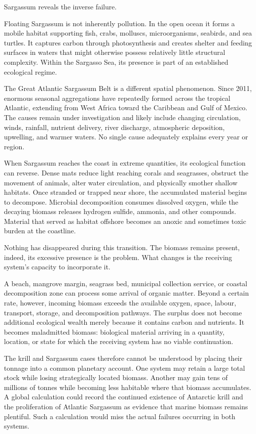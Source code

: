 \documentclass[11pt,oneside]{book}
\begin{document}
Sargassum reveals the inverse failure.

Floating Sargassum is not inherently pollution. In the open ocean it forms a mobile habitat supporting fish, crabs, molluscs, microorganisms, seabirds, and sea turtles. It captures carbon through photosynthesis and creates shelter and feeding surfaces in waters that might otherwise possess relatively little structural complexity. Within the Sargasso Sea, its presence is part of an established ecological regime.

The Great Atlantic Sargassum Belt is a different spatial phenomenon. Since 2011, enormous seasonal aggregations have repeatedly formed across the tropical Atlantic, extending from West Africa toward the Caribbean and Gulf of Mexico. The causes remain under investigation and likely include changing circulation, winds, rainfall, nutrient delivery, river discharge, atmospheric deposition, upwelling, and warmer waters. No single cause adequately explains every year or region.

When Sargassum reaches the coast in extreme quantities, its ecological function can reverse. Dense mats reduce light reaching corals and seagrasses, obstruct the movement of animals, alter water circulation, and physically smother shallow habitats. Once stranded or trapped near shore, the accumulated material begins to decompose. Microbial decomposition consumes dissolved oxygen, while the decaying biomass releases hydrogen sulfide, ammonia, and other compounds. Material that served as habitat offshore becomes an anoxic and sometimes toxic burden at the coastline.

Nothing has disappeared during this transition. The biomass remains present, indeed, its excessive presence is the problem. What changes is the receiving system's capacity to incorporate it.

A beach, mangrove margin, seagrass bed, municipal collection service, or coastal decomposition zone can process some arrival of organic matter. Beyond a certain rate, however, incoming biomass exceeds the available oxygen, space, labour, transport, storage, and decomposition pathways. The surplus does not become additional ecological wealth merely because it contains carbon and nutrients. It becomes maladmitted biomass: biological material arriving in a quantity, location, or state for which the receiving system has no viable continuation.

The krill and Sargassum cases therefore cannot be understood by placing their tonnage into a common planetary account. One system may retain a large total stock while losing strategically located biomass. Another may gain tens of millions of tonnes while becoming less habitable where that biomass accumulates. A global calculation could record the continued existence of Antarctic krill and the proliferation of Atlantic Sargassum as evidence that marine biomass remains plentiful. Such a calculation would miss the actual failures occurring in both systems.
\end{document}
